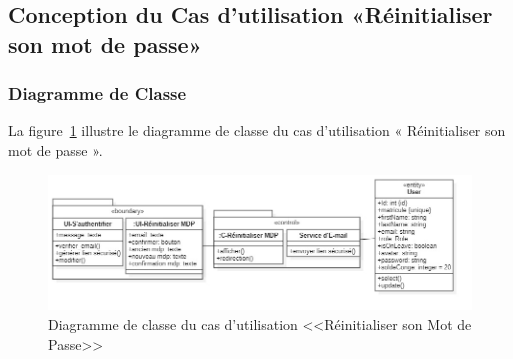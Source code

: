 \subsection{Conception du Cas d'utilisation «Réinitialiser son mot de passe»}
\subsubsection{Diagramme de Classe}
La figure~\ref{fig:class_reset_password} illustre le diagramme de classe du cas d’utilisation « Réinitialiser son mot de passe ».
\begin{figure}[h]
     \centering
     \includegraphics[width=17cm]{images/c_reset.jpg}
     \caption{Diagramme de classe du cas d'utilisation <<Réinitialiser son Mot de Passe>>}
     \label{fig:class_reset_password}
\end{figure}
